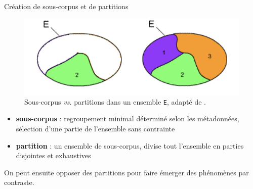 \documentclass[xetex,xcolor={table,usenames,dvipsnames}]{beamer}
\newcommand{\bolder}[1]{{\color{purple}\bfseries#1}}
\begin{document}
\begin{frame}{Création de sous-corpus et de partitions}
		\begin{figure}[h] %
		\centering
		\includegraphics[width=.5\linewidth]{img/partition_sous-corpus.png}
		\caption{Sous-corpus \textit{vs.} partitions dans un ensemble \texttt{E}, adapté de \textcite{fort}.}
		\label{fig:ling_out_TAL}
	\end{figure}
	\begin{itemize}
		\item \bolder{sous-corpus} : regroupement \og{}minimal\fg{} déterminé selon les métadonnées, sélection d'une partie de l'ensemble sans contrainte
		\item \bolder{partition} : un ensemble de sous-corpus, divise tout l'ensemble en parties disjointes et exhaustives
	\end{itemize}
	On peut ensuite \og{}opposer\fg{} des partitions pour faire émerger des	phénomènes par contraste.
 
\end{frame}
\end{document}
